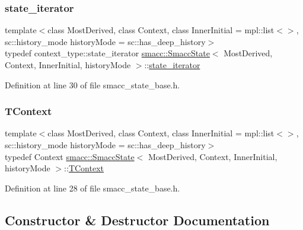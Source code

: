 \subsubsection{\texorpdfstring{state\+\_\+iterator}{state\_iterator}}
{\footnotesize\ttfamily template$<$class Most\+Derived, class Context, class Inner\+Initial = mpl\+::list$<$$>$, sc\+::history\+\_\+mode history\+Mode = sc\+::has\+\_\+deep\+\_\+history$>$ \\
typedef context\+\_\+type\+::state\+\_\+iterator \hyperlink{classsmacc_1_1SmaccState}{smacc\+::\+Smacc\+State}$<$ Most\+Derived, Context, Inner\+Initial, history\+Mode $>$\+::\hyperlink{classsmacc_1_1SmaccState_a12497b38e710f07cacb5d45efc024339}{state\+\_\+iterator}}



Definition at line 30 of file smacc\+\_\+state\+\_\+base.\+h.

\mbox{\label{classsmacc_1_1SmaccState_a9953ba0428a8c46f7d72c70bc3f87db4}} 
\subsubsection{\texorpdfstring{T\+Context}{TContext}}
{\footnotesize\ttfamily template$<$class Most\+Derived, class Context, class Inner\+Initial = mpl\+::list$<$$>$, sc\+::history\+\_\+mode history\+Mode = sc\+::has\+\_\+deep\+\_\+history$>$ \\
typedef Context \hyperlink{classsmacc_1_1SmaccState}{smacc\+::\+Smacc\+State}$<$ Most\+Derived, Context, Inner\+Initial, history\+Mode $>$\+::\hyperlink{classsmacc_1_1SmaccState_a9953ba0428a8c46f7d72c70bc3f87db4}{T\+Context}}



Definition at line 28 of file smacc\+\_\+state\+\_\+base.\+h.



\subsection{Constructor \& Destructor Documentation}
\mbox{\label{classsmacc_1_1SmaccState_a2fbeaca0f063a909d17de2c3040c8d17}} 
